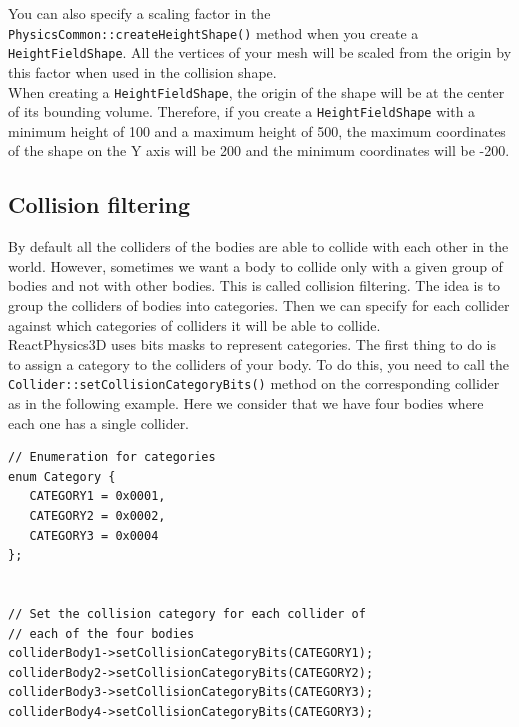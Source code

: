 \documentclass[a4paper,12pt]{article}
\begin{document}
  You can also specify a scaling factor in the \texttt{PhysicsCommon::createHeightShape()} method  when you create a \texttt{Height\allowbreak FieldShape}.
  All the vertices of your mesh will be scaled from the origin by this factor when used in the collision shape. \\

  When creating a \texttt{HeightFieldShape}, the origin of the shape will be at the center of its bounding volume.
  Therefore, if you create a \texttt{HeightFieldShape} with a minimum height of 100 and a maximum height of 500, the
  maximum coordinates of the shape on the Y axis will be 200 and the minimum coordinates will be -200.

    \subsection{Collision filtering}
    \label{sec:collisionfiltering}

    By default all the colliders of the bodies are able to collide with each other in the world. However, sometimes we want a body to collide only
    with a given group of bodies and not with other bodies. This is called collision filtering. The idea is to group the colliders of bodies into
    categories. Then we can specify for each collider against which categories of colliders it will be able to collide. \\

    ReactPhysics3D uses bits masks to represent categories. The first thing to do is to assign a category to the colliders of your body. To do
    this, you need to call the \texttt{Collider::setCollisionCategoryBits()} method on the corresponding collider as in the following example. Here
    we consider that we have four bodies where each one has a single collider. \\

    \begin{lstlisting}
// Enumeration for categories
enum Category {
   CATEGORY1 = 0x0001,
   CATEGORY2 = 0x0002,
   CATEGORY3 = 0x0004
};


// Set the collision category for each collider of
// each of the four bodies
colliderBody1->setCollisionCategoryBits(CATEGORY1);
colliderBody2->setCollisionCategoryBits(CATEGORY2);
colliderBody3->setCollisionCategoryBits(CATEGORY3);
colliderBody4->setCollisionCategoryBits(CATEGORY3);
  \end{lstlisting}

    \vspace{0.6cm}
\end{document}
